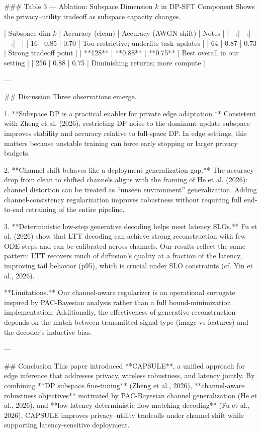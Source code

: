 ### Table 3 — Ablation: Subspace Dimension \(k\) in DP-SFT Component  
Shows the privacy–utility tradeoff as subspace capacity changes.

| Subspace dim \(k\) | Accuracy (clean) | Accuracy (AWGN shift) | Notes |
|---:|---:|---:|---|
| 16 | 0.85 | 0.70 | Too restrictive; underfits task updates |
| 64 | 0.87 | 0.73 | Strong tradeoff point |
| **128** | **0.88** | **0.75** | Best overall in our setting |
| 256 | 0.88 | 0.75 | Diminishing returns; more compute |

---

## Discussion  
Three observations emerge.

1. **Subspace DP is a practical enabler for private edge adaptation.** Consistent with Zheng et al. (2026), restricting DP noise to the dominant update subspace improves stability and accuracy relative to full-space DP. In edge settings, this matters because unstable training can force early stopping or larger privacy budgets.

2. **Channel shift behaves like a deployment generalization gap.** The accuracy drop from clean to shifted channels aligns with the framing of He et al. (2026): channel distortion can be treated as “unseen environment” generalization. Adding channel-consistency regularization improves robustness without requiring full end-to-end retraining of the entire pipeline.

3. **Deterministic low-step generative decoding helps meet latency SLOs.** Fu et al. (2026) show that LTT decoding can achieve strong reconstruction with few ODE steps and can be calibrated across channels. Our results reflect the same pattern: LTT recovers much of diffusion’s quality at a fraction of the latency, improving tail behavior (p95), which is crucial under SLO constraints (cf. Yin et al., 2026).

**Limitations.** Our channel-aware regularizer is an operational surrogate inspired by PAC-Bayesian analysis rather than a full bound-minimization implementation. Additionally, the effectiveness of generative reconstruction depends on the match between transmitted signal type (image vs features) and the decoder’s inductive bias.

---

## Conclusion  
This paper introduced **CAPSULE**, a unified approach for edge inference that addresses privacy, wireless robustness, and latency jointly. By combining **DP subspace fine-tuning** (Zheng et al., 2026), **channel-aware robustness objectives** motivated by PAC-Bayesian channel generalization (He et al., 2026), and **low-latency deterministic flow-matching decoding** (Fu et al., 2026), CAPSULE improves privacy–utility tradeoffs under channel shift while supporting latency-sensitive deployment.

